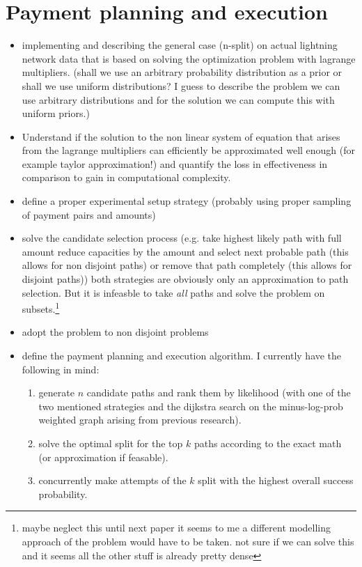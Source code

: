 \documentclass[10pt,twocolumn]{article}
\begin{document}
\section{Payment planning and execution}
\begin{itemize}
\item implementing and describing the general case (n-split) on actual lightning network data that is based on solving the optimization problem with lagrange multipliers. (shall we use an arbitrary probability distribution as a prior or shall we use uniform distributions? I guess to describe the problem we can use arbitrary distributions and for the solution we can compute this with uniform priors.)
\item Understand if the solution to the non linear system of equation that arises from the lagrange multipliers can efficiently be approximated well enough (for example taylor approximation!) and quantify the loss in effectiveness in comparison to gain in computational complexity.
\item define a proper experimental setup strategy (probably using proper sampling of payment pairs and amounts)
\item solve the candidate selection process (e.g. take highest likely path with full amount reduce capacities by the amount and select next probable path (this allows for non disjoint paths) or remove that path completely (this allows for disjoint paths)) both strategies are obviously only an approximation to path selection. But it is infeasble to take \textit{all} paths and solve the problem on subsets.\footnote{maybe neglect this until next paper it seems to me a different modelling approach of the problem would have to be taken. not sure if we can solve this and it seems all the other stuff is already pretty dense}
\item adopt the problem to non disjoint problems
\item define the payment planning and execution algorithm. I currently have the following in mind:
  \begin{enumerate}
  \item generate $n$ candidate paths and rank them by likelihood (with one of the two mentioned strategies and the dijkstra search on the minus-log-prob weighted graph arising from previous research).
  \item solve the optimal split for the top $k$ paths according to the exact math (or approximation if feasable).
  \item concurrently make attempts of the $k$ split with the highest overall success probability.

\end{enumerate}
\end{itemize}
\end{document}
